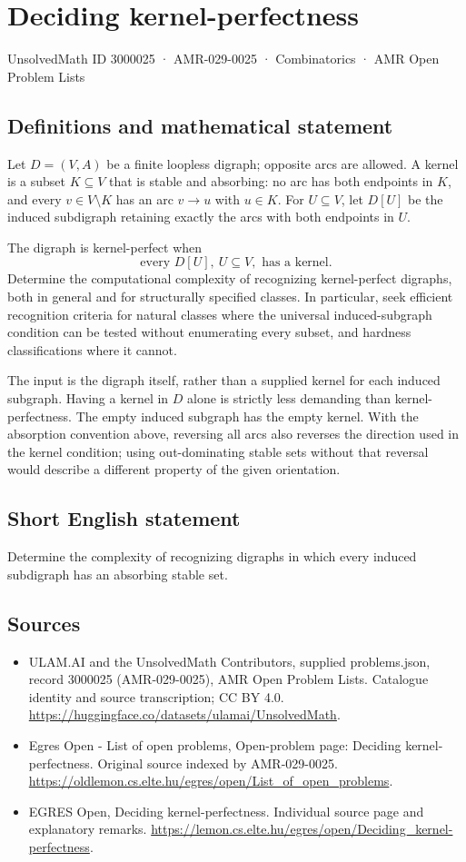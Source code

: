 \documentclass[11pt,a4paper]{article}
\begin{document}
\section*{Deciding kernel-perfectness}\label{3000025}
{\small UnsolvedMath ID 3000025 · AMR-029-0025 · Combinatorics · AMR Open Problem Lists}
\subsection{Definitions and mathematical statement}
Let $D=(V,A)$ be a finite loopless digraph; opposite arcs are allowed.
A kernel is a subset $K\subseteq V$ that is stable and absorbing:
no arc has both endpoints in $K$, and every $v\in V\setminus K$
has an arc $v\to u$ with $u\in K$. For $U\subseteq V$, let $D[U]$
be the induced subdigraph retaining exactly the arcs with both endpoints
in $U$.

The digraph is kernel-perfect when
\[
                        \text{every }D[U],\ U\subseteq V,
                        \text{ has a kernel}.
\]
Determine the computational complexity of recognizing kernel-perfect
digraphs, both in general and for structurally specified classes.
In particular, seek efficient recognition criteria for natural classes
where the universal induced-subgraph condition can be tested without
enumerating every subset, and hardness classifications where it cannot.

The input is the digraph itself, rather than a supplied kernel for each
induced subgraph. Having a kernel in $D$ alone is strictly less demanding
than kernel-perfectness. The empty induced subgraph has the empty kernel.
With the absorption convention above, reversing all arcs also reverses
the direction used in the kernel condition; using out-dominating stable
sets without that reversal would describe a different property of the
given orientation.
\subsection{Short English statement}
Determine the complexity of recognizing digraphs in which every
induced subdigraph has an absorbing stable set.
\subsection{Sources}
\begin{itemize}
\item[S1] ULAM.AI and the UnsolvedMath Contributors, supplied problems.json, record 3000025 (AMR-029-0025), AMR Open Problem Lists. Catalogue identity and source transcription; CC BY 4.0.
\url{https://huggingface.co/datasets/ulamai/UnsolvedMath}.
\item[S2] Egres Open - List of open problems, Open-problem page: Deciding kernel-perfectness. Original source indexed by AMR-029-0025.
\url{https://oldlemon.cs.elte.hu/egres/open/List_of_open_problems}.
\item[S3] EGRES Open, Deciding kernel-perfectness. Individual source page and explanatory remarks.
\url{https://lemon.cs.elte.hu/egres/open/Deciding_kernel-perfectness}.
\end{itemize}
\end{document}
